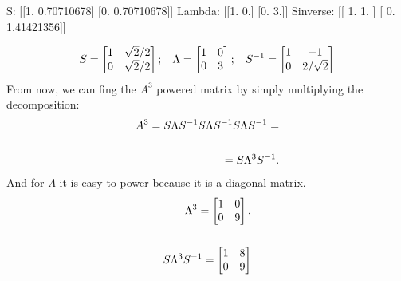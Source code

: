 \documentclass[letterpaper,10pt,english]{jupyterBook}
\begin{document}
\begin{sphinxVerbatim}[commandchars=\\\{\}]
S:
[[1.         0.70710678]
 [0.         0.70710678]]
Lambda:
[[1. 0.]
 [0. 3.]]
S\PYGZus{}inverse:
[[ 1.         \PYGZhy{}1.        ]
 [ 0.          1.41421356]]
\end{sphinxVerbatim}
\begin{equation*}
\begin{split}S = 
\begin{bmatrix}
1 & \sqrt{2}/2\\
0 & \sqrt{2}/{2}
\end{bmatrix}
;\hspace{3mm}
\Lambda = 
\begin{bmatrix}
1 & 0\\
0 & 3
\end{bmatrix}
;\hspace{3mm}
S^{-1} = 
\begin{bmatrix}
1 & -1\\
0 & 2/\sqrt{2}
\end{bmatrix}
\end{split}
\end{equation*}
\sphinxAtStartPar
From now, we can fing the \(A^3\) powered matrix by simply multiplying the decomposition:
\begin{equation*}
\begin{split}
A^3 = S\Lambda S^{-1} S \Lambda S^{-1} S \Lambda S^{-1} =
\\
\hspace{1mm}
\\
= S \Lambda^3 S^{-1}.
\end{split}
\end{equation*}
\sphinxAtStartPar
And for \(\Lambda\) it is easy to power because it is a diagonal matrix.
\begin{equation*}
\begin{split}
\Lambda ^3 =
\begin{bmatrix}
1 & 0\\
0 & 9
\end{bmatrix}
,
\\
\hspace{1mm}
\\
S\Lambda ^3 S^{-1} = 
\begin{bmatrix}
1 & 8\\
0 & 9
\end{bmatrix}
\end{split}
\end{equation*}
\sphinxAtStartPar
\end{document}
